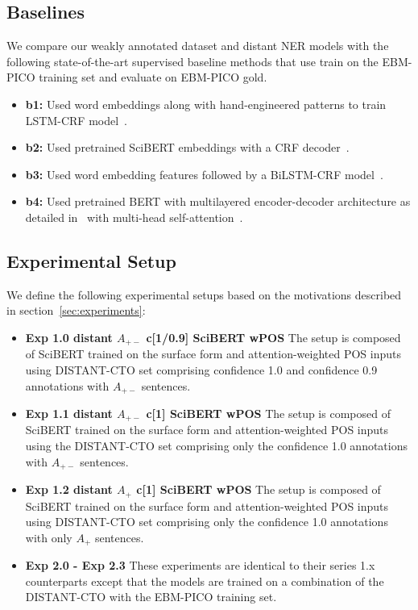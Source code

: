 \documentclass[letterpaper]{article} %
\begin{document}
\subsection{Baselines}
\label{subsec:base}
%
We compare our weakly annotated dataset and distant NER models with the following state-of-the-art supervised baseline methods that use train on the EBM-PICO training set and evaluate on EBM-PICO gold.
\begin{itemize}
    \item \textbf{b1:} Used word embeddings along with hand-engineered patterns to train LSTM-CRF model~\cite{nye2018corpus}. %
    \item \textbf{b2:} Used pretrained SciBERT embeddings with a CRF decoder~\cite{beltagy2019scibert}.
    \item \textbf{b3:} Used word embedding features followed by a BiLSTM-CRF model~\cite{brockmeier2019improving}.
    \item \textbf{b4:} Used pretrained BERT with multilayered encoder-decoder architecture as detailed in~\cite{vaswani2017attention} with multi-head self-attention~\cite{stylianou2021transformed}.
\end{itemize}
%
\subsection{Experimental Setup}
\label{subsec:expsetup}
%
We define the following experimental setups based on the motivations described in section~\ref{sec:experiments}:
\begin{itemize}
    \item \textbf{Exp 1.0 distant $A_{+-}$ c[1/0.9] SciBERT wPOS} The setup is composed of SciBERT trained on the surface form and attention-weighted POS inputs using DISTANT-CTO set comprising confidence 1.0 and confidence 0.9 annotations with $A_{+-}$ sentences.
    \item \textbf{Exp 1.1 distant $A_{+-}$ c[1] SciBERT wPOS} The setup is composed of SciBERT trained on the surface form and attention-weighted POS inputs using the DISTANT-CTO set comprising only the confidence 1.0 annotations with $A_{+-}$ sentences.
    \item \textbf{Exp 1.2 distant $A_{+}$ c[1] SciBERT wPOS} The setup is composed of SciBERT trained on the surface form and attention-weighted POS inputs using DISTANT-CTO set comprising only the confidence 1.0 annotations with only $A_{+}$ sentences.
    \item \textbf{Exp 2.0 - Exp 2.3 } These experiments are identical to their series 1.x counterparts except that the models are trained on a combination of the DISTANT-CTO with the EBM-PICO training set.
\end{itemize}
%
\end{document}
